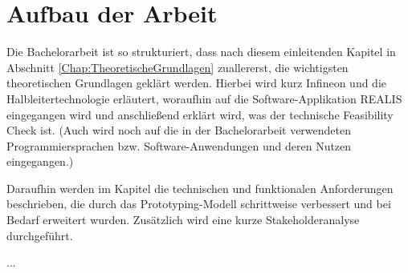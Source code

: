 \section{Aufbau der Arbeit}
Die Bachelorarbeit ist so strukturiert, dass nach diesem einleitenden Kapitel in Abschnitt \ref{Chap:TheoretischeGrundlagen} zuallererst, die wichtigsten theoretischen Grundlagen geklärt werden. 
Hierbei wird kurz Infineon und die Halbleitertechnologie erläutert, woraufhin auf die Software-Applikation \gls{REALIS} eingegangen wird und anschließend erklärt wird, was der technische Feasibility Check ist. (Auch wird noch auf die in der Bachelorarbeit verwendeten Programmiersprachen bzw. Software-Anwendungen und deren Nutzen eingegangen.)

Daraufhin werden im Kapitel  die technischen und funktionalen Anforderungen beschrieben, die durch das Prototyping-Modell schrittweise verbessert und bei Bedarf erweitert wurden. Zusätzlich wird eine kurze Stakeholderanalyse durchgeführt.

...